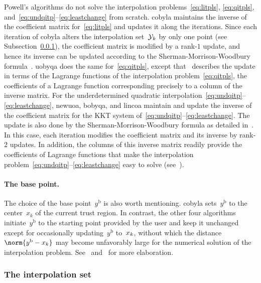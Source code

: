 \documentclass{article}
\numberwithin{equation}{section}
\theoremstyle{definition}
\theoremstyle{plain}
\theoremstyle{remark}
\newcommand{\base}{{\text{b}}}
\newcommand{\iter}[1][k]{x\ifthenelse{\equal{#1}{}}{}{_{#1}}}
\newcommand{\xpt}[1][k]{\mathcal{Y}\ifthenelse{\equal{#1}{}}{}{_{#1}}}
\begin{document}
Powell's algorithms do not solve the interpolation problems~\eqref{eq:litpls}, \eqref{eq:qitpls}, and~\eqref{eq:undqitp}--\eqref{eq:leastchange} from scratch.
\Gls{cobyla} maintains the inverse of the coefficient matrix for~\eqref{eq:litpls} and updates it along the iterations.
Since each iteration of \gls{cobyla} alters the interpolation set~$\xpt$ by only one point (see Subsection~\ref{ssec:iptset}), the coefficient matrix is modified by a rank-$1$ update, and hence its inverse can be updated according to the Sherman-Morrison-Woodbury formula~\cite{Hager_1989}.
\Gls{uobyqa} does the same for~\eqref{eq:qitpls}, except that~\cite[\S~4]{Powell_2002} describes the update in terms of the Lagrange functions of the interpolation problem~\eqref{eq:qitpls}, the coefficients of a Lagrange function corresponding precisely to a column of the inverse matrix.
For the underdetermined quadratic interpolation~\eqref{eq:undqitp}--\eqref{eq:leastchange}, \gls{newuoa}, \gls{bobyqa}, and \gls{lincoa} maintain and update the inverse of the coefficient matrix for the KKT system of~\eqref{eq:undqitp}--\eqref{eq:leastchange}.
The update is also done by the Sherman-Morrison-Woodbury formula as detailed in~\cite[\S~2]{Powell_2004c}.
In this case, each iteration modifies the coefficient matrix and its inverse by rank-$2$ updates.
In addition, the columns of this inverse matrix readily provide the coefficients of Lagrange
functions that make the interpolation problem~\eqref{eq:undqitp}--\eqref{eq:leastchange} easy to
solve (see~\cite[\S~3]{Powell_2004b}).

\paragraph{The base point.}

The choice of the base point~$y^{\base}$ is also worth mentioning.
\Gls{cobyla} sets~$y^{\base}$ to the center~$x_k$ of the current trust region.
In contrast, the other four algorithms initiate~$y^{\base}$ to the starting point provided by the user and keep it unchanged except for occasionally updating~$y^{\base}$ to~$\iter$, without which the distance~$\norm{y^{\base}-\iter}$ may become unfavorably large for the numerical solution of the interpolation problem.
See~\cite[\S~5]{Powell_2004b} and~\cite[\S~7]{Powell_2006} for more elaboration.

\subsubsection{The interpolation set}
\label{ssec:iptset}
\end{document}

